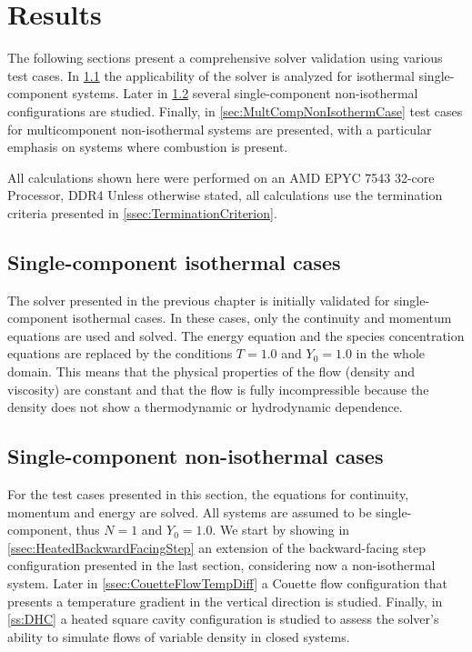 \chapter{Results}	\label{ch:results}
\glsresetall
The following sections present a comprehensive solver validation using various test cases. In \cref{sec:SingleCompIsotCase} the applicability of the solver is analyzed for isothermal single-component systems. Later in \cref{sec:SinCompNonIsothermCase} several single-component non-isothermal configurations are studied. Finally, in \cref{sec:MultCompNonIsothermCase} test cases for multicomponent non-isothermal systems are presented, with a particular emphasis on systems where combustion is present.

All calculations shown here were performed on an AMD EPYC 7543 32-core Processor, DDR4 %
Unless otherwise stated, all calculations use the termination criteria presented in \cref{ssec:TerminationCriterion}.
\section{Single-component isothermal cases}\label{sec:SingleCompIsotCase}
The solver presented in the previous chapter is initially validated for single-component isothermal cases. In these cases, only the continuity and momentum equations are used and solved. The energy equation and the species concentration equations are replaced by the conditions $T = 1.0$ and $Y_0 = 1.0$ in the whole domain. This means that the physical properties of the flow (density and viscosity) are constant and that the flow is fully incompressible because the density does not show a thermodynamic or hydrodynamic dependence.


\section{Single-component non-isothermal cases} \label{sec:SinCompNonIsothermCase}
For the test cases presented in this section, the equations for continuity, momentum and energy are solved. All systems are assumed to be single-component, thus $N = 1$ and $Y_0 = 1.0$. We start by showing in \cref{ssec:HeatedBackwardFacingStep} an extension of the backward-facing step configuration presented in the last section, considering now a non-isothermal system. Later in \cref{ssec:CouetteFlowTempDiff} a Couette flow configuration that presents a temperature gradient in the vertical direction is studied. Finally, in \cref{ss:DHC} a heated square cavity configuration is studied to assess the solver's ability to simulate flows of variable density in closed systems.



